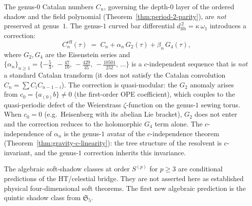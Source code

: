 \begin{remark}
\label{rem:genus-1-catalan-correction}%
%
%
The genus-$0$ Catalan numbers $C_n$, governing the depth-$0$
layer of the ordered shadow and the field polynomial
(Theorem~\ref{thm:period-2-parity}), are \emph{not} preserved
at genus~$1$. The genus-$1$ curved bar differential
$d_{\mathrm{fib}}^{\,2} = \kappa\,\omega_1$ introduces a correction:
\begin{equation}\label{eq:genus-1-catalan-effective}
C_n^{\mathrm{eff}}(\tau)
\;=\;
C_n + \alpha_n\, G_2(\tau) + \beta_n\, G_4(\tau),
\end{equation}
where $G_2, G_4$ are the Eisenstein series and
$\{\alpha_n\}_{n \ge 1} = \{-\tfrac{5}{3},\,
-\tfrac{47}{10},\, -\tfrac{429}{35},\,
-\tfrac{10501}{252},\, \ldots\}$ is a $c$-independent sequence
that is \emph{not} a standard Catalan transform (it does not
satisfy the Catalan convolution $C_n = \sum C_i C_{n-1-i}$).
The correction is quasi-modular: the $G_2$ anomaly arises
from $c_0 = \{a_{(0)}b\} \neq 0$ (the first-order OPE coefficient),
which couples to the quasi-periodic defect of the
Weierstrass $\zeta$-function on the genus-$1$ sewing torus.
When $c_0 = 0$ (e.g.\ Heisenberg with its abelian Lie
bracket), $G_2$ does not enter and the
correction reduces to the holomorphic $G_4$ term alone.
The $c$-independence of $\alpha_n$ is the genus-$1$ avatar of the
$c$-independence theorem
(Theorem~\ref{thm:gravity-c-linearity}): the tree structure
of the resolvent is $c$-invariant, and the genus-$1$
correction inherits this invariance.
\end{remark}

\begin{remark}
The algebraic soft-shadow classes at order $S^{(p)}$ for
$p \ge 3$ are conditional predictions of the HT/celestial bridge.
They are not asserted here as established physical four-dimensional
soft theorems. The first new algebraic prediction is the quintic
shadow class from $\mathfrak{S}_5$.
\end{remark}

